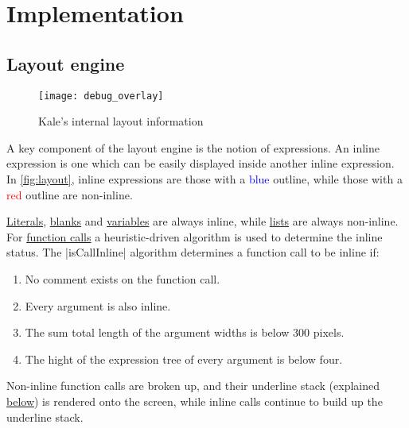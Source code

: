 \chapter{Implementation}

\section{Layout engine}

\begin{wrapfigure}[11]{r}{0.5\columnwidth}
\texttt{[image: debug\_overlay]}
\caption{Kale's internal layout information\protect\footnotemark}
\label{fig:layout}
\end{wrapfigure}
\medskip

A key component of the layout engine is the notion of  expressions.
An inline expression is one which can be easily displayed inside another inline
expression. In \autoref{fig:layout}, inline expressions are those with a
\textcolor{blue}{blue} outline, while those with a \textcolor{red}{red} outline
are non-inline.

\hyperref[expr:literal]{Literals}, \hyperref[expr:blank]{blanks} and
\hyperref[expr:variable]{variables} are always inline, while
\hyperref[expr:list]{lists} are always non-inline.
For \hyperref[expr:function]{function calls} a heuristic-driven algorithm is
used to determine the inline status. The |isCallInline| algorithm determines
a function call to be inline if:

\begin{enumerate}[noitemsep]
	\item No comment exists on the function call.
	\item Every argument is also inline.
	\item The sum total length of the argument widths is below 300 pixels.
	\item The hight of the expression tree of every argument is below four.
\end{enumerate}

Non-inline function calls are broken up, and their underline stack (explained
\hyperref[layout:underlines]{below}) is rendered onto the screen, while inline
calls continue to build up the underline stack.

